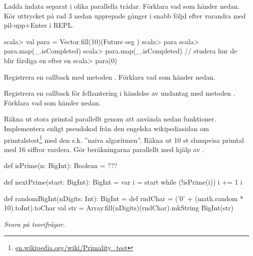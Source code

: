 \Subtask Ladda indata separat i olika parallella trådar. Förklara vad som händer nedan. Kör uttrycket på rad 3 nedan upprepade gånger i snabb följd efter varandra med pil-upp+Enter i REPL.
\begin{REPL}
scala> val para = Vector.fill(10)(Future{ seg })
scala> para
scala> para.map(_.isCompleted)   
scala> para.map(_.isCompleted) // studera hur de blir färdiga en efter en
scala> para(0)
\end{REPL}

\Subtask Registrera en callback med metoden . Förklara vad som händer nedan.


\Subtask Registrera en callback för felhantering i händelse av undantag med metoden . Förklara vad som händer nedan.


\ExtraTasks %


\Task Räkna ut stora primtal parallellt genom att använda nedan funktioner. Implementera  enligt pseudokod från den engelska wikipediasidan om primtalstest\footnote{\href{https://en.wikipedia.org/wiki/Primality_test}{en.wikipedia.org/wiki/Primality\_test}} med den s.k. ''naiva algoritmen''.  Räkna ut 10 st slumpvisa primtal med 16 siffror vardera. Gör beräkningarna parallellt med hjälp av .

\begin{Code}
def isPrime(n: BigInt): Boolean = ???

def nextPrime(start: BigInt): BigInt = {
  var i = start
  while (!isPrime(i)) { i += 1 }
  i
}

def randomBigInt(nDigits: Int): BigInt = {
   def rndChar = ('0' + (math.random * 10).toInt).toChar
   val str = Array.fill(nDigits)(rndChar).mkString
   BigInt(str)
}
\end{Code}

\Task\Pen \emph{Svara på teorifrågor.}

